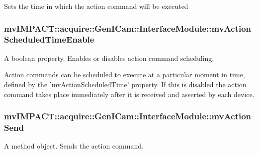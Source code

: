 Sets the time in which the action command will be executed \hypertarget{classmv_i_m_p_a_c_t_1_1acquire_1_1_gen_i_cam_1_1_interface_module_aa47f8bb572ffa118eaf8196342b405a3}{
\subsubsection[{mv\+Action\+Scheduled\+Time\+Enable}]{ mv\+I\+M\+P\+A\+C\+T\+::acquire\+::\+Gen\+I\+Cam\+::\+Interface\+Module\+::mv\+Action\+Scheduled\+Time\+Enable}}\label{classmv_i_m_p_a_c_t_1_1acquire_1_1_gen_i_cam_1_1_interface_module_aa47f8bb572ffa118eaf8196342b405a3}


A boolean property. Enables or disables action command scheduling. 

Action commands can be scheduled to execute at a particular moment in time, defined by the 'mv\+Action\+Scheduled\+Time' property. If this is disabled the action command takes place immediately after it is received and asserted by each device. \hypertarget{classmv_i_m_p_a_c_t_1_1acquire_1_1_gen_i_cam_1_1_interface_module_a9c36083fad033a38e3fe8df7e91e3bd2}{
\subsubsection[{mv\+Action\+Send}]{ mv\+I\+M\+P\+A\+C\+T\+::acquire\+::\+Gen\+I\+Cam\+::\+Interface\+Module\+::mv\+Action\+Send}}\label{classmv_i_m_p_a_c_t_1_1acquire_1_1_gen_i_cam_1_1_interface_module_a9c36083fad033a38e3fe8df7e91e3bd2}


A method object. Sends the action command. 

